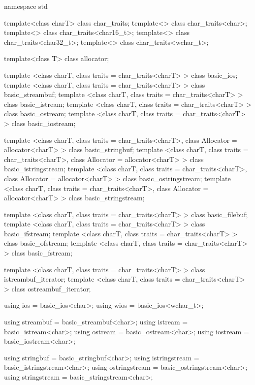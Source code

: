 \begin{codeblock}
namespace std {
  template<class charT> class char_traits;
  template<> class char_traits<char>;
  template<> class char_traits<char16_t>;
  template<> class char_traits<char32_t>;
  template<> class char_traits<wchar_t>;

  template<class T> class allocator;

  template <class charT, class traits = char_traits<charT> >
    class basic_ios;
  template <class charT, class traits = char_traits<charT> >
    class basic_streambuf;
  template <class charT, class traits = char_traits<charT> >
    class basic_istream;
  template <class charT, class traits = char_traits<charT> >
    class basic_ostream;
  template <class charT, class traits = char_traits<charT> >
    class basic_iostream;

  template <class charT, class traits = char_traits<charT>,
      class Allocator = allocator<charT> >
    class basic_stringbuf;
  template <class charT, class traits = char_traits<charT>,
      class Allocator = allocator<charT> >
    class basic_istringstream;
  template <class charT, class traits = char_traits<charT>,
      class Allocator = allocator<charT> >
    class basic_ostringstream;
  template <class charT, class traits = char_traits<charT>,
      class Allocator = allocator<charT> >
    class basic_stringstream;

  template <class charT, class traits = char_traits<charT> >
    class basic_filebuf;
  template <class charT, class traits = char_traits<charT> >
    class basic_ifstream;
  template <class charT, class traits = char_traits<charT> >
    class basic_ofstream;
  template <class charT, class traits = char_traits<charT> >
    class basic_fstream;

  template <class charT, class traits = char_traits<charT> >
    class istreambuf_iterator;
  template <class charT, class traits = char_traits<charT> >
    class ostreambuf_iterator;

  using ios  = basic_ios<char>;
  using wios = basic_ios<wchar_t>;

  using streambuf = basic_streambuf<char>;
  using istream   = basic_istream<char>;
  using ostream   = basic_ostream<char>;
  using iostream  = basic_iostream<char>;

  using stringbuf     = basic_stringbuf<char>;
  using istringstream = basic_istringstream<char>;
  using ostringstream = basic_ostringstream<char>;
  using stringstream  = basic_stringstream<char>;

}
\end{codeblock}

